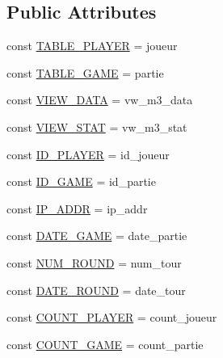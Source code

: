 \subsection*{Public Attributes}
\begin{DoxyCompactItemize}
\item 
const \hyperlink{class_m3_game_a3cb375f0f17771eacad1ddda6df2668b}{T\+A\+B\+L\+E\+\_\+\+P\+L\+A\+Y\+ER} = \textquotesingle{}joueur\textquotesingle{}
\item 
const \hyperlink{class_m3_game_ad28c90a7ca5eae9b08ead40979de156f}{T\+A\+B\+L\+E\+\_\+\+G\+A\+ME} = \textquotesingle{}partie\textquotesingle{}
\item 
const \hyperlink{class_m3_game_a7fe842d0022922952e21e6f0a1cd5d4e}{V\+I\+E\+W\+\_\+\+D\+A\+TA} = \textquotesingle{}vw\+\_\+m3\+\_\+data\textquotesingle{}
\item 
const \hyperlink{class_m3_game_a5c987dca0edf70067f2ccc44287e8a11}{V\+I\+E\+W\+\_\+\+S\+T\+AT} = \textquotesingle{}vw\+\_\+m3\+\_\+stat\textquotesingle{}
\item 
const \hyperlink{class_m3_game_a06dabac4dcdd87171e08ebf1bd7a36ab}{I\+D\+\_\+\+P\+L\+A\+Y\+ER} = \textquotesingle{}id\+\_\+joueur\textquotesingle{}
\item 
const \hyperlink{class_m3_game_a34480a034aedca037f65a0818ad5c9f6}{I\+D\+\_\+\+G\+A\+ME} = \textquotesingle{}id\+\_\+partie\textquotesingle{}
\item 
const \hyperlink{class_m3_game_abde6ff14061ff191d9925e5ac052c037}{I\+P\+\_\+\+A\+D\+DR} = \textquotesingle{}ip\+\_\+addr\textquotesingle{}
\item 
const \hyperlink{class_m3_game_a69bcdab6a3a6c850fdebce7f98d4da62}{D\+A\+T\+E\+\_\+\+G\+A\+ME} = \textquotesingle{}date\+\_\+partie\textquotesingle{}
\item 
const \hyperlink{class_m3_game_a9f47a65d1f3bc6309e75cd9c01f6c91c}{N\+U\+M\+\_\+\+R\+O\+U\+ND} = \textquotesingle{}num\+\_\+tour\textquotesingle{}
\item 
const \hyperlink{class_m3_game_a3745214b2714253c925e76889b7f7176}{D\+A\+T\+E\+\_\+\+R\+O\+U\+ND} = \textquotesingle{}date\+\_\+tour\textquotesingle{}
\item 
const \hyperlink{class_m3_game_a6bfae016f5eb538accd9f4395724c749}{C\+O\+U\+N\+T\+\_\+\+P\+L\+A\+Y\+ER} = \textquotesingle{}count\+\_\+joueur\textquotesingle{}
\item 
const \hyperlink{class_m3_game_a6be45891c330f7edbae32e54fc703fb8}{C\+O\+U\+N\+T\+\_\+\+G\+A\+ME} = \textquotesingle{}count\+\_\+partie\textquotesingle{}

\end{DoxyCompactItemize}
